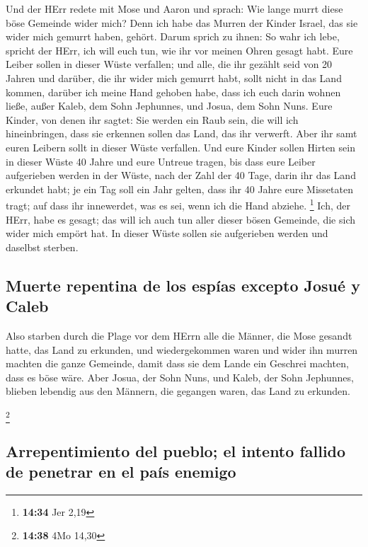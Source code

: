  Und der HErr redete mit Mose und Aaron und sprach:
 Wie lange murrt diese böse Gemeinde wider mich? Denn ich
habe das Murren der Kinder Israel, das sie wider mich gemurrt haben,
gehört.  Darum sprich zu ihnen: So wahr ich lebe, spricht
der HErr, ich will euch tun, wie ihr vor meinen Ohren gesagt habt.
 Eure Leiber sollen in dieser Wüste verfallen; und alle,
die ihr gezählt seid von 20 Jahren und darüber, die ihr wider mich
gemurrt habt,  sollt nicht in das Land kommen, darüber
ich meine Hand gehoben habe, dass ich euch darin wohnen ließe, außer
Kaleb, dem Sohn Jephunnes, und Josua, dem Sohn Nuns. 
Eure Kinder, von denen ihr sagtet: Sie werden ein Raub sein, die will
ich hineinbringen, dass sie erkennen sollen das Land, das ihr verwerft.
 Aber ihr samt euren Leibern sollt in dieser Wüste
verfallen.  Und eure Kinder sollen Hirten sein in dieser
Wüste 40 Jahre und eure Untreue tragen, bis dass eure Leiber aufgerieben
werden in der Wüste,  nach der Zahl der 40 Tage, darin
ihr das Land erkundet habt; je ein Tag soll ein Jahr gelten, dass ihr 40
Jahre eure Missetaten tragt; auf dass ihr innewerdet, was es sei, wenn
ich die Hand abziehe. \footnote{\textbf{14:34} Jer 2,19} 
Ich, der HErr, habe es gesagt; das will ich auch tun aller dieser bösen
Gemeinde, die sich wider mich empört hat. In dieser Wüste sollen sie
aufgerieben werden und daselbst sterben.

\hypertarget{muerte-repentina-de-los-espuxedas-excepto-josuuxe9-y-caleb}{%
\subsection{Muerte repentina de los espías excepto Josué y
Caleb}\label{muerte-repentina-de-los-espuxedas-excepto-josuuxe9-y-caleb}}

 Also starben durch die Plage vor dem HErrn alle die
Männer, die Mose gesandt hatte, das Land zu erkunden, und wiedergekommen
waren und wider ihn murren machten die ganze Gemeinde, 
damit dass sie dem Lande ein Geschrei machten, dass es böse wäre.
 Aber Josua, der Sohn Nuns, und Kaleb, der Sohn
Jephunnes, blieben lebendig aus den Männern, die gegangen waren, das
Land zu erkunden.

\footnote{\textbf{14:38} 4Mo 14,30}

\hypertarget{arrepentimiento-del-pueblo-el-intento-fallido-de-penetrar-en-el-pauxeds-enemigo}{%
\subsection{Arrepentimiento del pueblo; el intento fallido de penetrar
en el país
enemigo}\label{arrepentimiento-del-pueblo-el-intento-fallido-de-penetrar-en-el-pauxeds-enemigo}}

